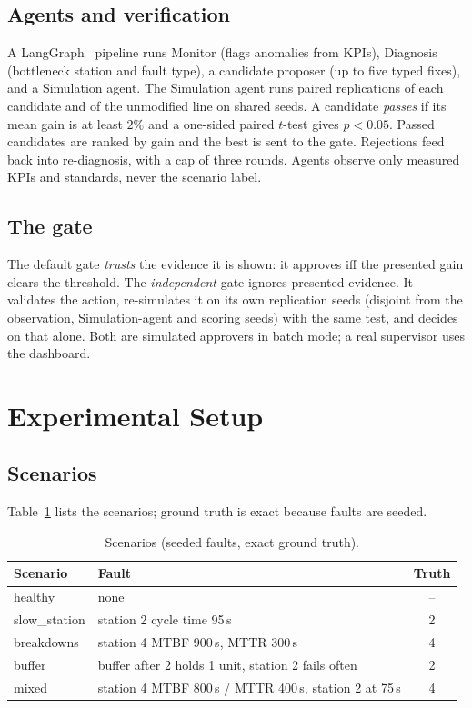\documentclass[conference]{IEEEtran}
\begin{document}
\subsection{Agents and verification}
A LangGraph~\cite{langgraph} pipeline runs Monitor (flags anomalies from KPIs), Diagnosis (bottleneck station
and fault type), a candidate proposer (up to five typed fixes), and a Simulation agent. The Simulation agent
runs \NReps{} paired replications of each candidate and of the unmodified line on shared seeds. A candidate
\emph{passes} if its mean gain is at least $2\%$ and a one-sided paired $t$-test gives $p<0.05$. Passed
candidates are ranked by gain and the best is sent to the gate. Rejections feed back into re-diagnosis, with a
cap of three rounds. Agents observe only measured KPIs and standards, never the scenario label.

\subsection{The gate}
The default gate \emph{trusts} the evidence it is shown: it approves iff the presented gain clears the
threshold. The \emph{independent} gate ignores presented evidence. It validates the action, re-simulates it on
its own replication seeds (disjoint from the observation, Simulation-agent and scoring seeds) with the same
test, and decides on that alone. Both are simulated approvers in batch mode; a real supervisor uses the
dashboard.

\section{Experimental Setup}
\subsection{Scenarios}
Table~\ref{tab:scenarios} lists the scenarios; ground truth is exact because faults are seeded.
\begin{table}[t]
\centering\small
\caption{Scenarios (seeded faults, exact ground truth).}
\label{tab:scenarios}
\begin{tabular}{@{}lp{}c@{}}
\toprule
Scenario & Fault & Truth \\
\midrule
healthy & none & -- \\
slow\_station & station 2 cycle time 95\,s & 2 \\
breakdowns & station 4 MTBF 900\,s, MTTR 300\,s & 4 \\
buffer & buffer after 2 holds 1 unit, station 2 fails often & 2 \\
mixed & station 4 MTBF 800\,s / MTTR 400\,s, station 2 at 75\,s & 4 \\
\bottomrule
\end{tabular}
\end{table}
\end{document}
